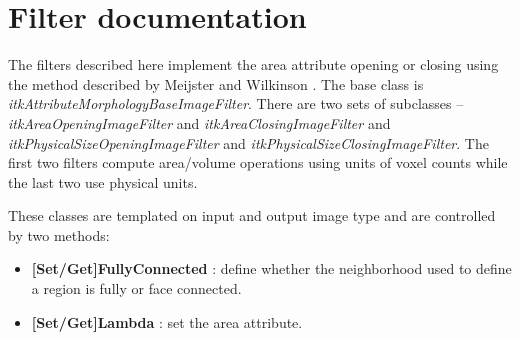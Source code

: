 \documentclass{InsightArticle}
\begin{document}
\section{Filter documentation}
The filters described here implement the area attribute opening or
closing using the method described by Meijster and Wilkinson
\cite{meijster02}. The base class is {\em
itkAttributeMorphologyBaseImageFilter}. There are two sets of
subclasses -- {\em itkAreaOpeningImageFilter} and {\em
itkAreaClosingImageFilter} and {\em itkPhysicalSizeOpeningImageFilter}
and {\em itkPhysicalSizeClosingImageFilter}. The first two filters
compute area/volume operations using units of voxel counts while the
last two use physical units.

These classes are templated on input and output image type and are
controlled by two methods:
\begin{itemize}
\item {\bf [Set/Get]FullyConnected} : define whether the neighborhood used to define a region is fully or face connected.
\item {\bf [Set/Get]Lambda} : set the area attribute.
\end{itemize}


\appendix





\nocite{ITKSoftwareGuide}
\end{document}
